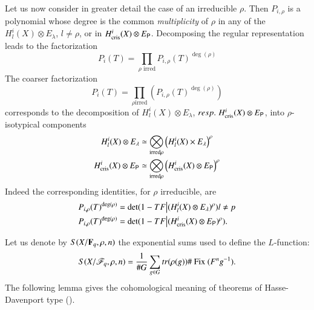 Let us now consider in greater detail the case of an irreducible $\rho$. Then $P_{i, \rho}$ is a polynomial whose degree is the common \textit{multiplicity} of $\rho$ in any of the $H^i_l(X) \otimes E_\lambda$, $l \neq \rho$, or in $H^i_{\text{cris}} (X) \otimes E_{\mathsf{P}}$. Decomposing the regular representation leads to the factorization
$$
P_i (T) = \prod\limits_{\rho \text{ irred}} P_{i, \rho} (T)^{\deg (\rho)}
$$
The coarser factorization 
$$
P_i (T) = \prod\limits_{ \rho \text{irred}} (P_{i,\rho} (T)^{\deg(\rho)})
$$
corresponds to the decomposition of $H^i_l(X) \otimes E_\lambda$, ${resp.}\kern.3em H^i_{\text{cris}} (X) \otimes E_{\mathsf{P}}$, into $\rho$-isotypical components
\begin{gather*}
H^i_l (X) \otimes E_\lambda \simeq \bigotimes\limits_{\text{irred} \rho } \left(H^i_l(X) \times E_\lambda \right)^\rho\\
H^i_{\text{cris}} (X) \otimes E_{\mathsf{P}} \simeq \bigotimes\limits_{\text{irred} \rho} \left(H^i_{\text{cris}} (X) \otimes E_{\mathsf{P}} \right)^\rho
\end{gather*}
Indeed the corresponding identities, for $\rho$ irreducible, are 
\begin{align*}
P_{i,\rho} (T)^{\deg(\rho)}  & = \det (1 - TF \big| (H^i_l (X) \otimes E_\lambda)^\rho) l \neq p\\
P_{i, \rho} (T)^{\deg (\rho)} & = \det (1 - TF \big| (H^i_{\text{cris}} (X) \otimes E_{\mathsf{P}})^\rho).
\end{align*}

Let us denote by $S(X/ \mathbf{F}_q, \rho, n)$ the exponential sums used to define the $L$-function:
$$
S (X/ \mathscr{F}_q , \rho, n) = \frac{1}{\# G} \sum\limits_{g \in G} tr (\rho (g)) \# \text{ Fix }(F^n g^{-1}). 
$$
The following lemma gives the cohomological meaning of theorems of Hasse-Davenport type (\cf \cite{art6-key20}).

